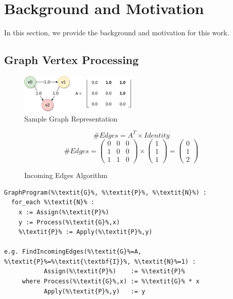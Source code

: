 \section{Background and Motivation}

In this section, we provide the background and motivation for this work.

\subsection{Graph Vertex Processing}

\begin{figure}[htbp]
\centering
\includegraphics[width=0.5\textwidth]{figures/sample_graph}
\caption{Sample Graph Representation}
\label{fig:sample_graph}
\end{figure}

\begin{figure}[ htbp ] 
\begin{equation}
\#Edges = A^{T} \times Identity
\end{equation}
\begin{equation}
\#Edges = 
\left(\begin{array}{ccc} 0 & 0 & 0 \\ 1 & 0 & 0 \\ 1 & 1 & 0 \end{array}\right) \times
\left(\begin{array}{c} 1 \\ 1 \\ 1 \end{array}\right) 
= \left(\begin{array}{c} 0 \\ 1 \\ 2 \end{array}\right) 
\end{equation}
\caption{Incoming Edges Algorithm}
\label{fig:sample_algorithm}
\end{figure} 

\begin{lstlisting}[emph={Assign, Process, Apply}, emphstyle=\color{blue}, numbers=none, escapechar=\%, caption=Graph Vertex Processing Model]
GraphProgram(%\textit{G}%, %\textit{P}%, %\textit{N}%) :
  for_each %\textit{N}% :
    x := Assign(%\textit{P}%)
  	y := Process(%\textit{G}%,x)
  	%\textit{P}% := Apply(%\textit{P}%,y)	  
  
e.g. FindIncomingEdges(%\textit{G}%=A, %\textit{P}%=%\textit{\textbf{I}}%, %\textit{N}%=1) :
           Assign(%\textit{P}%)    := %\textit{P}%
     where Process(%\textit{G}%,x) := %\textit{G}% * x
           Apply(%\textit{P}%,y)   := y
\end{lstlisting}

